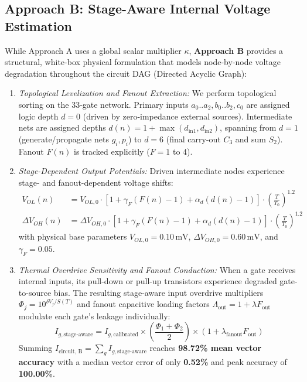 \documentclass[11pt,a4paper]{article}
\begin{document}
\subsection{Approach B: Stage-Aware Internal Voltage Estimation}
While Approach A uses a global scalar multiplier $\kappa$, \textbf{Approach B} provides a structural, white-box physical formulation that models node-by-node voltage degradation throughout the circuit DAG (Directed Acyclic Graph):
\begin{enumerate}
    \item \textit{Topological Levelization and Fanout Extraction:} We perform topological sorting on the 33-gate network. Primary inputs $a_0..a_2, b_0..b_2, c_0$ are assigned logic depth $d=0$ (driven by zero-impedance external sources). Intermediate nets are assigned depths $d(n) = 1 + \max(d_{\text{in1}}, d_{\text{in2}})$, spanning from $d=1$ (generate/propagate nets $g_i, p_i$) to $d=6$ (final carry-out $C_3$ and sum $S_2$). Fanout $F(n)$ is tracked explicitly ($F=1$ to $4$).
    \item \textit{Stage-Dependent Output Potentials:} Driven intermediate nodes experience stage- and fanout-dependent voltage shifts:
    \begin{align}
        V_{OL}(n) &= V_{OL,0} \cdot \left[1 + \gamma_F (F(n) - 1) + \alpha_d (d(n) - 1)\right] \cdot \left(\frac{T}{T_0}\right)^{1.2} \\
        \Delta V_{OH}(n) &= \Delta V_{OH,0} \cdot \left[1 + \gamma_F (F(n) - 1) + \alpha_d (d(n) - 1)\right] \cdot \left(\frac{T}{T_0}\right)^{1.2}
    \end{align}
    with physical base parameters $V_{OL,0} = 0.10\,\text{mV}$, $\Delta V_{OH,0} = 0.60\,\text{mV}$, and $\gamma_F = 0.05$.
    \item \textit{Thermal Overdrive Sensitivity and Fanout Conduction:} When a gate receives internal inputs, its pull-down or pull-up transistors experience degraded gate-to-source bias. The resulting stage-aware input overdrive multipliers $\Phi_j = 10^{\delta V_j / S(T)}$ and fanout capacitive loading factors $\Lambda_{\text{out}} = 1 + \lambda F_{\text{out}}$ modulate each gate's leakage individually:
    \begin{equation}
        I_{g,\text{stage-aware}} = I_{g,\text{calibrated}} \times \left(\frac{\Phi_1 + \Phi_2}{2}\right) \times \left(1 + \lambda_{\text{fanout}} F_{\text{out}}\right)
    \end{equation}
    Summing $I_{\text{circuit, B}} = \sum_{g} I_{g,\text{stage-aware}}$ reaches \textbf{98.72\% mean vector accuracy} with a median vector error of only \textbf{0.52\%} and peak accuracy of \textbf{100.00\%}.
\end{enumerate}
\end{document}
